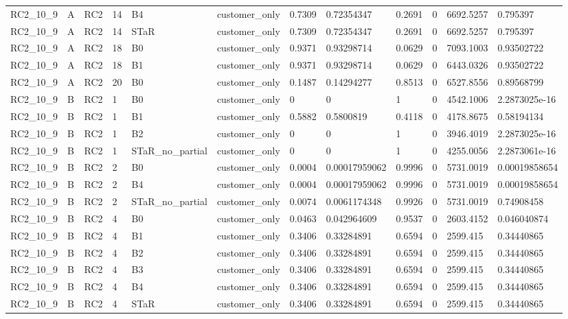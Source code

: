 \begin{longtable}{llllllllllll}
RC2\_10\_9 & A & RC2 & 14 & B4 & customer\_only & 0.7309 & 0.72354347 & 0.2691 & 0 & 6692.5257 & 0.795397 \\
RC2\_10\_9 & A & RC2 & 14 & STaR & customer\_only & 0.7309 & 0.72354347 & 0.2691 & 0 & 6692.5257 & 0.795397 \\
RC2\_10\_9 & A & RC2 & 18 & B0 & customer\_only & 0.9371 & 0.93298714 & 0.0629 & 0 & 7093.1003 & 0.93502722 \\
RC2\_10\_9 & A & RC2 & 18 & B1 & customer\_only & 0.9371 & 0.93298714 & 0.0629 & 0 & 6443.0326 & 0.93502722 \\
RC2\_10\_9 & A & RC2 & 20 & B0 & customer\_only & 0.1487 & 0.14294277 & 0.8513 & 0 & 6527.8556 & 0.89568799 \\
RC2\_10\_9 & B & RC2 & 1 & B0 & customer\_only & 0 & 0 & 1 & 0 & 4542.1006 & 2.2873025e-16 \\
RC2\_10\_9 & B & RC2 & 1 & B1 & customer\_only & 0.5882 & 0.5800819 & 0.4118 & 0 & 4178.8675 & 0.58194134 \\
RC2\_10\_9 & B & RC2 & 1 & B2 & customer\_only & 0 & 0 & 1 & 0 & 3946.4019 & 2.2873025e-16 \\
RC2\_10\_9 & B & RC2 & 1 & STaR\_no\_partial & customer\_only & 0 & 0 & 1 & 0 & 4255.0056 & 2.2873061e-16 \\
RC2\_10\_9 & B & RC2 & 2 & B0 & customer\_only & 0.0004 & 0.00017959062 & 0.9996 & 0 & 5731.0019 & 0.00019858654 \\
RC2\_10\_9 & B & RC2 & 2 & B4 & customer\_only & 0.0004 & 0.00017959062 & 0.9996 & 0 & 5731.0019 & 0.00019858654 \\
RC2\_10\_9 & B & RC2 & 2 & STaR\_no\_partial & customer\_only & 0.0074 & 0.0061174348 & 0.9926 & 0 & 5731.0019 & 0.74908458 \\
RC2\_10\_9 & B & RC2 & 4 & B0 & customer\_only & 0.0463 & 0.042964609 & 0.9537 & 0 & 2603.4152 & 0.046040874 \\
RC2\_10\_9 & B & RC2 & 4 & B1 & customer\_only & 0.3406 & 0.33284891 & 0.6594 & 0 & 2599.415 & 0.34440865 \\
RC2\_10\_9 & B & RC2 & 4 & B2 & customer\_only & 0.3406 & 0.33284891 & 0.6594 & 0 & 2599.415 & 0.34440865 \\
RC2\_10\_9 & B & RC2 & 4 & B3 & customer\_only & 0.3406 & 0.33284891 & 0.6594 & 0 & 2599.415 & 0.34440865 \\
RC2\_10\_9 & B & RC2 & 4 & B4 & customer\_only & 0.3406 & 0.33284891 & 0.6594 & 0 & 2599.415 & 0.34440865 \\
RC2\_10\_9 & B & RC2 & 4 & STaR & customer\_only & 0.3406 & 0.33284891 & 0.6594 & 0 & 2599.415 & 0.34440865 \\

\end{longtable}
